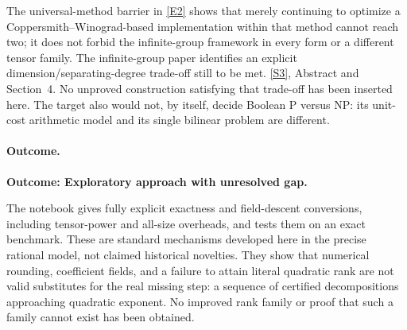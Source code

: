 \documentclass[11pt,a4paper]{article}
\newcommand{\sref}[2]{\hyperlink{source:#1:#2}{[S#2]}}
\newcommand{\eref}[2]{\hyperlink{extra:#1:#2}{[E#2]}}
\numberwithin{equation}{section}
\begin{document}
The universal-method barrier in \eref{statement}{2} shows that merely continuing
to optimize a Coppersmith--Winograd-based implementation within that
method cannot reach two; it does not forbid the infinite-group framework
in every form or a different tensor family. The infinite-group paper
identifies an explicit dimension/separating-degree trade-off still to be
met. \sref{statement}{3}, Abstract and Section~4. No unproved construction
satisfying that trade-off has been inserted here. The target also would
not, by itself, decide Boolean P versus NP: its unit-cost arithmetic
model and its single bilinear problem are different.

\paragraph{Outcome.}
\textbf{Outcome: Exploratory approach with unresolved gap.}

The notebook gives fully explicit exactness and field-descent conversions,
including tensor-power and all-size overheads, and tests them on an exact
benchmark. These are standard mechanisms developed here in the precise
rational model, not claimed historical novelties. They show that numerical
rounding, coefficient fields, and a failure to attain literal quadratic
rank are not valid substitutes for the real missing step: a sequence of
certified decompositions approaching quadratic exponent. No improved
rank family or proof that such a family cannot exist has been obtained.

\end{document}
